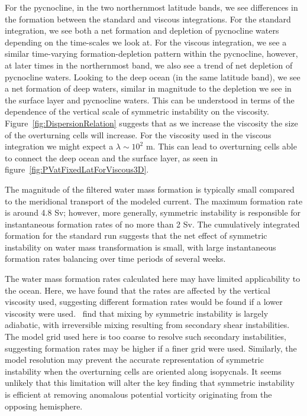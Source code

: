     For the pycnocline, in the two northernmost latitude bands, we see differences in the formation between the standard and viscous integrations. For the standard integration, we see both a net formation and depletion of pycnocline waters depending on the time-scales we look at. For the viscous integration, we see a similar time-varying formation-depletion pattern within the pycnocline, however, at later times in the northernmost band, we also see a trend of net depletion of pycnocline waters. Looking to the deep ocean (in the same latitude band), we see a net formation of deep waters, similar in magnitude to the depletion we see in the surface layer and pycnocline waters. This can be understood in terms of the dependence of the vertical scale of symmetric instability on the viscosity. Figure~\ref{fig:DispersionRelation} suggests that as we increase the viscosity the size of the overturning cells will increase. For the viscosity used in the viscous integration we might expect a $\lambda \sim 10^2$ m. This can lead to overturning cells able to connect the deep ocean and the surface layer, as seen in figure~\ref{fig:PVatFixedLatForViscous3D}.

    The magnitude of the filtered water mass formation is typically small compared to the meridional transport of the modeled current. The maximum formation rate is around 4.8 Sv; however, more generally, symmetric instability is responsible for instantaneous formation rates of no more than 2 Sv. The cumulatively integrated formation for the standard run suggests that the net effect of symmetric instability on water mass transformation is small, with large instantaneous formation rates balancing over time periods of several weeks.
    
    The water mass formation rates calculated here may have limited applicability to the ocean. Here, we have found that the rates are affected by the vertical viscosity used, suggesting different formation rates would be found if a lower viscosity were used.~\citet{Yankovsky2019} find that mixing by symmetric instability is largely adiabatic, with irreversible mixing resulting from secondary shear instabilities. The model grid used here is too coarse to resolve such secondary instabilities, suggesting formation rates may be higher if a finer grid were used. Similarly, the model resolution may prevent the accurate representation of symmetric instability when the overturning cells are oriented along isopycnals. It seems unlikely that this limitation will alter the key finding that symmetric instability is efficient at removing anomalous potential vorticity originating from the opposing hemisphere.
